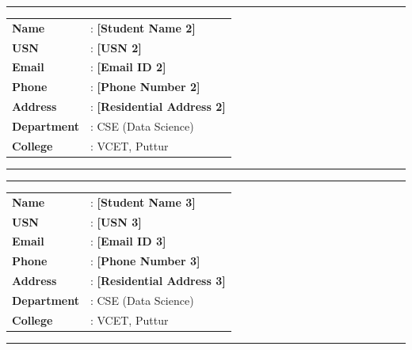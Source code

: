 \documentclass[12pt,a4paper]{report}
\begin{document}
\noindent\rule{\textwidth}{0.4pt}
\begin{minipage}[t]{0.25\textwidth}
\centering
\vspace{0.2cm}
\end{minipage}
\hfill
\begin{minipage}[t]{0.72\textwidth}
\vspace{0.2cm}
\begin{tabular}{ll}
\textbf{Name}       & : \textbf{[Student Name 2]} \\
\textbf{USN}        & : \textbf{[USN 2]} \\
\textbf{Email}      & : \textbf{[Email ID 2]} \\
\textbf{Phone}      & : \textbf{[Phone Number 2]} \\
\textbf{Address}    & : \textbf{[Residential Address 2]} \\
\textbf{Department} & : CSE (Data Science) \\
\textbf{College}    & : VCET, Puttur \\
\end{tabular}
\end{minipage}
\vspace{0.2cm}
\noindent\rule{\textwidth}{0.4pt}

\vspace{0.5cm}

\noindent\rule{\textwidth}{0.4pt}
\begin{minipage}[t]{0.25\textwidth}
\centering
\vspace{0.2cm}
\end{minipage}
\hfill
\begin{minipage}[t]{0.72\textwidth}
\vspace{0.2cm}
\begin{tabular}{ll}
\textbf{Name}       & : \textbf{[Student Name 3]} \\
\textbf{USN}        & : \textbf{[USN 3]} \\
\textbf{Email}      & : \textbf{[Email ID 3]} \\
\textbf{Phone}      & : \textbf{[Phone Number 3]} \\
\textbf{Address}    & : \textbf{[Residential Address 3]} \\
\textbf{Department} & : CSE (Data Science) \\
\textbf{College}    & : VCET, Puttur \\
\end{tabular}
\end{minipage}
\vspace{0.2cm}
\noindent\rule{\textwidth}{0.4pt}
\end{document}
